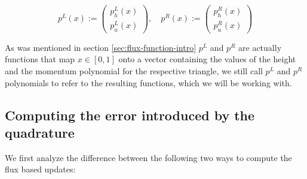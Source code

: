 \documentclass[a4paper, twoside]{article}
\begin{document}
\begin{equation*}
  p^L(x) :=
  \begin{pmatrix}
    p^L_h(x) \\ p^L_u(x)
  \end{pmatrix}, \quad
  p^R(x) :=
  \begin{pmatrix}
    p^R_h(x) \\ p^R_u(x)
  \end{pmatrix}
\end{equation*}

As was mentioned in section \ref{sec:flux-function-intro} $p^L$ and $p^R$ are actually functions that map $x \in [0,1]$ onto a vector containing the values of the height and the momentum polynomial for the respective triangle, we still call $p^L$ and $p^R$ polynomials to refer to the resulting functions, which we will be working with.

\subsection{Computing the error introduced by the quadrature}
\label{sec:goal-intro}

We first analyze the difference between the following two ways to compute the flux based updates:
\end{document}
